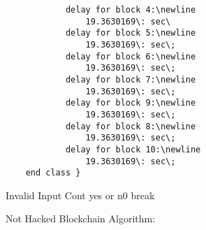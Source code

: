 \documentclass[12pt]{article}
\begin{document}
\begin{algorithm}[H]
{{{\begin{lstlisting}
            delay for block 4:\newline
                19.3630169\: sec\
            delay for block 5:\newline
                19.3630169\: sec\;
            delay for block 6:\newline
                19.3630169\: sec\;
            delay for block 7:\newline
                19.3630169\: sec\;
            delay for block 9:\newline
                19.3630169\: sec\;
            delay for block 8:\newline
                19.3630169\: sec\;
            delay for block 10:\newline
                19.3630169\: sec\;
    end class }
    \end{lstlisting}
  }

   }{
   Invalid Input\;
   \State Cont \gets yes\: or\: n0 \;
   {
   break\;
   }
  }
 }
 \caption{Not Hacked Blockchain Algorithm:}
\end{algorithm}
\end{document}
